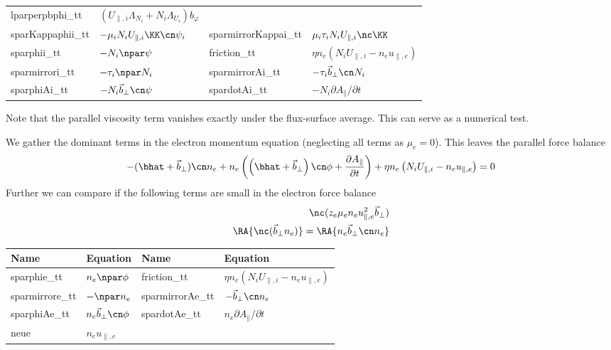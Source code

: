 \begin{longtable}{llll}
    lparperpbphi\_tt & $(U_{\parallel,i} \Lambda_{N_i} + N_i\Lambda_{U_i})b_\varphi $ \\
    sparKappaphii\_tt & $-\mu_i N_i U_{\parallel,i} \KK\cn \psi_i$ &
    sparmirrorKappai\_tt & $\mu_i\tau_i N_i U_{\parallel,i} \nc\KK$ \\
    sparphii\_tt & $-N_i\npar \psi$ &
    friction\_tt & $ \eta n_e(N_iU_{\parallel,i}-n_eu_{\parallel,e})$ \\
    sparmirrori\_tt & $-\tau_i\npar N_i$ &
    sparmirrorAi\_tt & $-\tau_i \vec b_\perp \cn N_i $ \\
    sparphiAi\_tt & $ -N_i \vec b_\perp \cn \psi $ &
    spardotAi\_tt & $ -N_i \partial A_\parallel /\partial t$ \\
\bottomrule
\end{longtable}
Note that the parallel viscosity term vanishes exactly under the flux-surface average. This can serve as a numerical test.

We gather the dominant terms in the electron momentum equation (neglecting all terms as $\mu_e=0$). This leaves the parallel force balance
\begin{align}
    -(\bhat + \vec b_\perp) \cn n_e +n_e\left( \left( \bhat + \vec b_\perp \right) \cn \phi + \frac{\partial A_\parallel}{\partial t} \right) +\eta n_e \left( N_iU_{\parallel,i} - n_eu_{\parallel,e}\right) = 0
\end{align}
Further we can compare if the following terms are small in the electron force balance
\begin{align*}
    \nc( z_e \mu_e n_e u_{\parallel,e}^2\vec b_\perp)\\
    \RA{\nc ( \vec b_\perp n_e )} = \RA{n_e \vec b_\perp \cn n_e}
\end{align*}
\begin{longtable}{llll}
\toprule
\rowcolor{gray!50}\textbf{Name} &  \textbf{Equation} &
\textbf{Name} &  \textbf{Equation}\\
\midrule
    sparphie\_tt & $n_e\npar \phi$ &
    friction\_tt & $ \eta n_e(N_iU_{\parallel,i}-n_eu_{\parallel,e})$ \\
    sparmirrore\_tt & $-\npar n_e$ &
    sparmirrorAe\_tt & $-\vec b_\perp \cn n_e $ \\
    sparphiAe\_tt & $n_e \vec b_\perp \cn \phi$ &
    spardotAe\_tt & $ n_e \partial A_\parallel /\partial t$ \\
    neue &$n_e u_{\parallel,e}$ &
    & \\
\bottomrule
\end{longtable}


